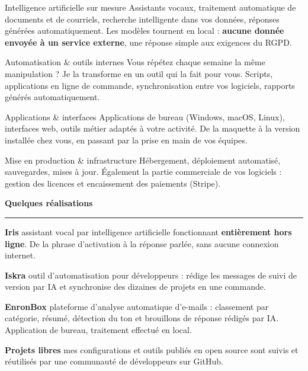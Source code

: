 \documentclass[10pt,a4paper]{article}
\newcommand{\nfsection}[1]{%
  \par\vspace{0.7em}%
  {\color{nfdark}\large\bfseries #1}\\[0.25em]%
  {\color{nfcyan}\rule{\linewidth}{1.2pt}}\par\vspace{-0.15em}%
}
\newcommand{\nfwork}[2]{%
  {\bfseries\color{nforange} #1} \textemdash{} #2\par\vspace{0.35em}%
}
\begin{document}
\begin{tcbraster}[raster columns=2, raster column skip=5mm, raster row skip=3.5mm,
                  raster equal height=rows]%
\begin{nfcard}{Intelligence artificielle sur mesure}
\footnotesize
Assistants vocaux, traitement automatique de documents et de courriels,
recherche intelligente dans vos données, réponses générées automatiquement.
Les modèles tournent en local : \textbf{aucune donnée envoyée à un service
externe}, une réponse simple aux exigences du RGPD.
\end{nfcard}%
\begin{nfcard}{Automatisation \& outils internes}
\footnotesize
Vous répétez chaque semaine la même manipulation ? Je la transforme en un outil
qui la fait pour vous. Scripts, applications en ligne de commande,
synchronisation entre vos logiciels, rapports générés automatiquement.
\end{nfcard}%
\begin{nfcard}{Applications \& interfaces}
\footnotesize
Applications de bureau (Windows, macOS, Linux), interfaces web, outils métier
adaptés à votre activité. De la maquette à la version installée chez vous,
en passant par la prise en main de vos équipes.
\end{nfcard}%
\begin{nfcard}{Mise en production \& infrastructure}
\footnotesize
Hébergement, déploiement automatisé, sauvegardes, mises à jour. Également la
partie commerciale de vos logiciels : gestion des licences et encaissement des
paiements (Stripe).
\end{nfcard}%
\end{tcbraster}

\nfsection{Quelques réalisations}

\nfwork{Iris}{assistant vocal par intelligence artificielle fonctionnant
\textbf{entièrement hors ligne}. De la phrase d'activation à la réponse parlée,
sans aucune connexion internet.}

\nfwork{Iskra}{outil d'automatisation pour développeurs : rédige les messages de
suivi de version par IA et synchronise des dizaines de projets en une commande.}

\nfwork{EnronBox}{plateforme d'analyse automatique d'e-mails : classement par
catégorie, résumé, détection du ton et brouillons de réponse rédigés par IA.
Application de bureau, traitement effectué en local.}

\nfwork{Projets libres}{mes configurations et outils publiés en open source sont
suivis et réutilisés par une communauté de développeurs sur GitHub.}
\end{document}
